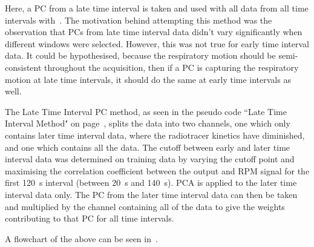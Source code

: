                 Here, a \gls{PC} from a late time interval is taken and used with all data from all time intervals with~. The motivation behind attempting this method was the observation that \glspl{PC} from late time interval data didn't vary significantly when different windows were selected. However, this was not true for early time interval data. It could be hypothesised, because the respiratory motion should be semi-consistent throughout the acquisition, then if a \gls{PC} is capturing the respiratory motion at late time intervals, it should do the same at early time intervals as well.
                    
                The Late Time Interval \gls{PC} method, as seen in the pseudo code ``Late Time Interval Method" on page~\pageref{alg:pca_data_driven_surrogate_signal_extraction_methods_for_dynamic_pet_methods_late_time_interval_method_pseudo_code}, splits the data into two channels, one which only contains later time interval data, where the radiotracer kinetics have diminished, and one which contains all the data. The cutoff between early and later time interval data was determined on training data by varying the cutoff point and maximising the correlation coefficient between the output and \gls{RPM} signal for the first \SI{120}{\second} interval (between \SI{20}{\second} and \SI{140}{\second}). \gls{PCA} is applied to the later time interval data only. The \gls{PC} from the later time interval data can then be taken and multiplied by the channel containing all of the data to give the weights contributing to that \gls{PC} for all time intervals.

                A flowchart of the above can be seen in~.

